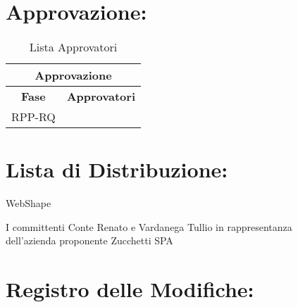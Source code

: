 \section*{\LARGE Approvazione:}
\begin{table}[!h]
	\begin{center}
		\begin{tabular}
			{|c|c|}
			\hline
			\multicolumn{2}{|c|}{ \textbf{Approvazione} } \\
			\hline
			\textbf{Fase} & \textbf{Approvatori} \\
			\hline
			\multirow{1}{*}{RPP-RQ} & \\
									
			\hline
		\end{tabular}
		\caption{Lista Approvatori} %
		\label{tabapprovazione}
	\end{center}
\end{table}

\textbf{}
\newpage
\section*{\LARGE Lista di Distribuzione:}

	\begin{elenconumerato}{\normindent}
		\item WebShape 
		\item I committenti Conte Renato e Vardanega Tullio in rappresentanza \\  dell'azienda proponente Zucchetti SPA
	\end{elenconumerato}




\section*{\Large Registro delle Modifiche:}


